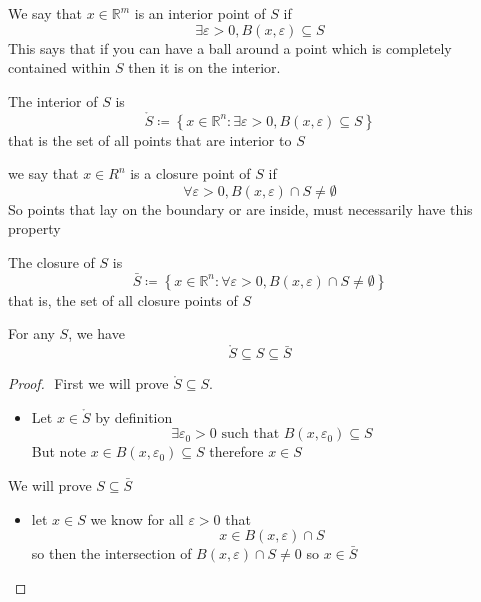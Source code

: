 \documentclass[11pt]{book}
\begin{document}
\begin{defn}\label{defn:interior_point}
    We say that $x \in \mathbb{R} ^{m} $ is an interior point of $S$ if 
    \[
    \exists \varepsilon  > 0, B\left(x, \varepsilon \right) \subseteq S
    \]
    This says that if you can have a ball around a point which is completely contained within $S$ then it is on the interior.
\end{defn}

\begin{defn}[Interior]\label{defn:interior}
    The interior of $S$ is 
    \[
        \mathring{S} \coloneqq \left\{ x\in \mathbb{R} ^{n} : \exists \varepsilon  > 0, B\left(x, \varepsilon \right) \subseteq S \right\} 
    \]
    that is the set of all points that are interior to $S$ 
\end{defn}

\newpage

\begin{defn}\label{defn:closure_point}
    we say that $x \in R^{n} $ is a closure point of $S$ if
    \[
    \forall \varepsilon  > 0, B\left(x, \varepsilon \right) \cap S \neq \emptyset  
    \]
    So points that lay on the boundary or are inside, must necessarily have this property
\end{defn}

\begin{defn}[Closure]\label{defn:closure}
    The closure of $S$ is
    \[
        \bar{S} \coloneqq \left\{ x \in \mathbb{R} ^{n} : \forall \varepsilon  > 0, B\left(x, \varepsilon \right) \cap S \neq \emptyset   \right\} 
    \]
    that is, the set of all closure points of $S$ 
\end{defn}

\begin{thm}\label{thm:connection_between_closure_and_interior}
    For any $S$, we have 
    \[
        \mathring{S} \subseteq S \subseteq \bar{S} 
    \]
\end{thm}

\begin{proof}
$ $\newline
    First we will prove $\mathring{S} \subseteq S$. 
    \begin{itemize}
        \item Let $x \in \mathring{S} $ by definition 
            \[
            \exists \varepsilon _{0}  > 0 \text{ such that } B\left(x, \varepsilon _{0} \right) \subseteq S 
            \]
            But note $x \in B\left(x, \varepsilon _{0} \right) \subseteq S$ therefore $x\in S$
    \end{itemize}
    We will prove $S \subseteq \bar{S} $ 
    \begin{itemize}
        \item let $x \in S$ we know for all $\varepsilon > 0$ that 
            \[
            x\in B\left(x, \varepsilon \right) \cap S
            \]
            so then the intersection of $B\left(x, \varepsilon \right) \cap S \neq 0 $ so $x \in \bar{S} $ 
    \end{itemize}
\end{proof}
\end{document}
